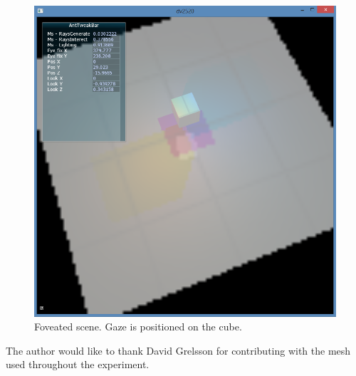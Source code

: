 \begin{figure}[h]
  \centering
  \includegraphics[width=0.9\linewidth]{img/fov_rt_et.png}
  \caption{Foveated scene. Gaze is positioned on the cube.}
  \label{fig:fov}
\end{figure}

\noindent
The author would like to thank David Grelsson for contributing with the mesh used throughout the experiment.
